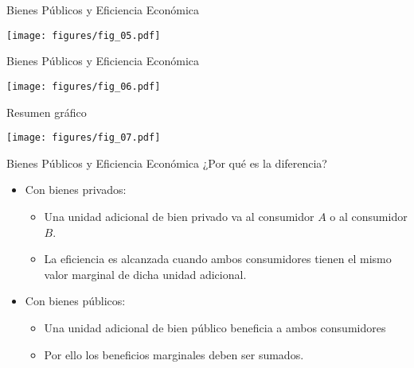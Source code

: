 \begin{frame}{Bienes Públicos y Eficiencia Económica}
	\begin{center}
		\texttt{[image: figures/fig\_05.pdf]}
	\end{center}
\end{frame}
\begin{frame}{Bienes Públicos y Eficiencia Económica}
	\begin{center}
		\hspace{-0.5cm} \texttt{[image: figures/fig\_06.pdf]}
	\end{center}
\end{frame}
\begin{frame}{Resumen gráfico}
	\begin{center}
		\texttt{[image: figures/fig\_07.pdf]}
	\end{center}
\end{frame}
\begin{frame}{Bienes Públicos y Eficiencia Económica}
	¿Por qué es la diferencia?
		\begin{itemize}
			\item Con bienes privados:
				\begin{itemize}
					\item Una unidad adicional de bien privado va al consumidor $A$ o al consumidor $B$.
					\item La eficiencia es alcanzada cuando ambos consumidores tienen el mismo valor marginal de dicha unidad adicional.
				\end{itemize}
			\item Con bienes públicos:
				\begin{itemize}
					\item Una unidad adicional de bien público beneficia a ambos consumidores
					\item Por ello los beneficios marginales deben ser sumados.
				\end{itemize}
		\end{itemize}
\end{frame}